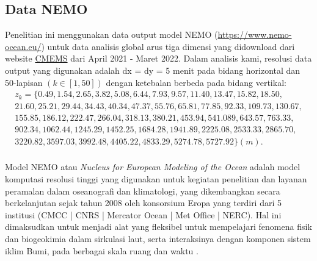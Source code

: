 \begin{spacing}{1.5}
\subsection[Data NEMO]{Data NEMO}
	Penelitian ini menggunakan data output model NEMO (\href{https://www.nemo-ocean.eu/}{https://www.nemo-ocean.eu/}) untuk data analisis global arus tiga dimensi yang didownload dari website \href{https://resources.marine.copernicus.eu/products}{CMEMS} dari April 2021 - Maret 2022.  Dalam analisis kami, resolusi data output yang digunakan adalah dx = dy = 5 menit pada bidang horizontal dan 50-lapisan $(k \in [1,50])$ dengan ketebalan berbeda pada bidang vertikal:
	\begin{equation*}
		\begin{aligned}
			z_k = \{0.49, 1.54, 2.65, 3.82, 5.08, 6.44, 7.93, 9.57, 11.40, 13.47, 15.82, 18.50, \\
			21.60, 25.21, 29.44, 34.43, 40.34, 47.37, 55.76, 65.81, 77.85, 92.33, 109.73, 130.67, \\
			155.85, 186.12, 222.47, 266.04, 318.13, 380.21, 453.94, 541.089, 643.57, 763.33, \\
			902.34, 1062.44, 1245.29, 1452.25, 1684.28, 1941.89, 2225.08, 2533.33, 2865.70,  \\
			3220.82, 3597.03, 3992.48, 4405.22, 4833.29, 5274.78, 5727.92 \} (m). \\
		\end{aligned}
	\end{equation*}
	\par Model NEMO atau \textit{Nucleus for European Modeling of the Ocean} adalah model komputasi resolusi tinggi yang digunakan untuk kegiatan penelitian dan layanan peramalan dalam oseanografi dan klimatologi, yang dikembangkan secara berkelanjutan sejak tahun 2008 oleh konsorsium Eropa yang terdiri dari 5 institusi (CMCC | CNRS | Mercator Ocean | Met Office | NERC). Hal ini dimaksudkan untuk menjadi alat yang fleksibel untuk mempelajari fenomena fisik dan biogeokimia dalam sirkulasi laut, serta interaksinya dengan komponen sistem iklim Bumi, pada berbagai skala ruang dan waktu \cite{madec_gurvan_2022_6334656}.

\end{spacing}
